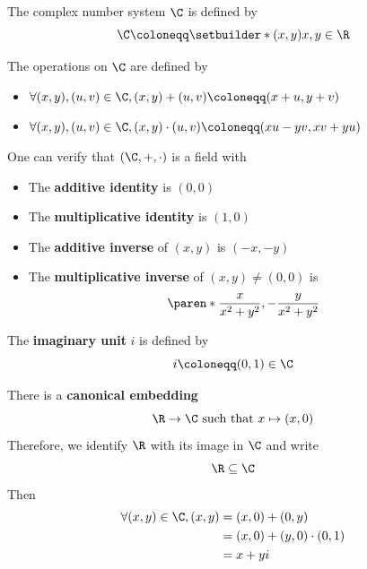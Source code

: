 \begin{definition} \label{an1:def:complex-number-system}
  The complex number system $\C$ is defined by
  \[
    \C \coloneqq \setbuilder*{(x, y)}{x, y \in \R}
  \]
\end{definition}

\begin{definition} \label{an1:def:operations-on-C}
  The operations on $\C$ are defined by
  \begin{itemize}
    \item $\forall (x, y), (u, v) \in \C, (x, y) + (u, v) \coloneqq (x + u, y + v)$
    \item $\forall (x, y), (u, v) \in \C, (x, y) \cdot (u, v) \coloneqq (xu - yv, xv + yu)$
  \end{itemize}
\end{definition}

\begin{remark}
  One can verify that $(\C, +, \cdot)$ is a field with
  \begin{itemize}
    \item The \textbf{additive identity} is $(0, 0)$
    \item The \textbf{multiplicative identity} is $(1, 0)$
    \item The \textbf{additive inverse} of $(x, y)$ is $(-x, -y)$
    \item The \textbf{multiplicative inverse} of $(x, y) \neq (0, 0)$ is
          \[
            \paren*{\frac{x}{x^{2} + y^{2}}, - \frac{y}{x^{2} + y^{2}}}
          \]
  \end{itemize}
\end{remark}

\begin{definition} \label{an1:def:imaginary-unit}
  The \textbf{imaginary unit} $i$ is defined by
  \[
    i \coloneqq (0, 1) \in \C
  \]
\end{definition}

\begin{remark}
  There is a \textbf{canonical embedding}
  \[
    \R \to \C \text{ such that } x \mapsto (x, 0)
  \]
  Therefore, we identify $\R$ with its image in $\C$ and write
  \[
    \R \subseteq \C
  \]
  Then
  \begin{align*}
    \forall (x, y) \in \C, (x, y) & = (x, 0) + (0, y)              \\
                                  & = (x, 0) + (y, 0) \cdot (0, 1) \\
                                  & = x + yi
  \end{align*}
\end{remark}

